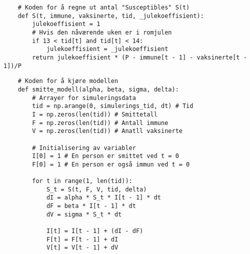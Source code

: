 \documentclass[12pt]{article}
\begin{document}
\begin{Codesnippet}
    \begin{verbatim}
    # Koden for å regne ut antal "Susceptibles" S(t)
    def S(t, immune, vaksinerte, tid, _julekoeffisient):
        julekoeffisient = 1
        # Hvis den nåværende uken er i romjulen
        if 13 < tid[t] and tid[t] < 14:
            julekoeffisient = _julekoeffisient
        return julekoeffisient * (P - immune[t - 1] - vaksinerte[t - 1])/P
    \end{verbatim}
\end{Codesnippet}
\begin{Codesnippet}
    \begin{verbatim}
    # Koden for å kjøre modellen
    def smitte_modell(alpha, beta, sigma, delta):
        # Arrayer for simuleringsdata
        tid = np.arange(0, simulerings_tid, dt) # Tid
        I = np.zeros(len(tid)) # Smittetall
        F = np.zeros(len(tid)) # Antall immune
        V = np.zeros(len(tid)) # Anatll vaksinerte

        # Initialisering av variabler
        I[0] = 1 # En person er smittet ved t = 0
        F[0] = 1 # En person er også immun ved t = 0

        for t in range(1, len(tid)):
            S_t = S(t, F, V, tid, delta)
            dI = alpha * S_t * I[t - 1] * dt
            dF = beta * I[t - 1] * dt
            dV = sigma * S_t * dt
            
            I[t] = I[t - 1] + (dI - dF)
            F[t] = F[t - 1] + dI
            V[t] = V[t - 1] + dV
    \end{verbatim}
\end{Codesnippet}
\end{document}
